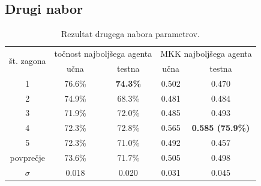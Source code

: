 \subsection{Drugi nabor}\label{subsec:dodatek-car-drugi-nabor}
\begin{table}[H]
    \begin{center}
        \begin{tabular}{|| c | c c || c c ||}
            \hline
            \multirow{2}{*}{št. zagona} & \multicolumn{2}{c||}{točnost najboljšega agenta} & \multicolumn{2}{c||}{MKK najboljšega agenta} \\ \cline{2-5}
            & učna   & testna          & učna  & testna                  \\
            \hline
            1         & 76.6\% & \textbf{74.3\%} & 0.502 & 0.470                   \\
            \hline
            2         & 74.9\% & 68.3\%          & 0.481 & 0.484                   \\
            \hline
            3         & 71.9\% & 72.0\%          & 0.485 & 0.493                   \\
            \hline
            4         & 72.3\% & 72.8\%          & 0.565 & \textbf{0.585 (75.9\%)} \\
            \hline
            5         & 72.3\% & 71.0\%          & 0.492 & 0.457                   \\
            \hline
            povprečje & 73.6\% & 71.7\%          & 0.505 & 0.498                   \\
            \hline
            $\sigma$  & 0.018  & 0.020            & 0.031 & 0.045                   \\
            \hline
        \end{tabular}
    \end{center}
    \caption{Rezultat drugega nabora parametrov.}
    \label{tab:car_result_2}
\end{table}

